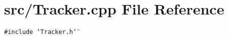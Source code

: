 \section{src/Tracker.cpp File Reference}
\label{Tracker_8cpp}
{\tt \#include \char`\"{}Tracker.h\char`\"{}}\par
